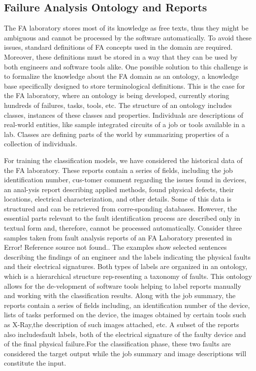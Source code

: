 \subsection{Failure Analysis Ontology and Reports}
\alert{The  FA  laboratory  stores  most  of  its  knowledge  as  free  texts, thus they might be ambiguous and cannot be processed by the software automatically. To avoid these issues, standard definitions of FA concepts used in the domain are required.  Moreover,  these  definitions  must  be stored  in  a  way that  they  can  be  used  by  both  engineers  and software tools alike. One  possible  solution  to  this  challenge  is  to  formalize  the knowledge about the FA domain as an ontology, a knowledge base  specifically  designed  to  store  terminological  definitions. This is the case for the FA laboratory, where an ontology is being  developed,  currently  storing  hundreds  of  failures,  tasks, tools, etc. The structure of an ontology includes classes, instances of these classes  and  properties.  Individuals  are  descriptions  of  real-world entities, like sample integrated circuits of a job or tools available  in  a  lab.  Classes  are  defining  parts  of  the  world  by summarizing  properties  of  a  collection  of  individuals.}

\alert{For training the classification models, we have considered the historical  data  of  the FA  laboratory.  These  reports  contain  a series  of  fields,  including  the  job  identification  number,  cus-tomer comment regarding the issues found in devices, an anal-ysis report describing applied methods, found physical defects, their  locations,  electrical  characterization,  and  other  details. Some of this data is structured and can be retrieved from corre-sponding databases. However, the essential parts relevant to the fault  identification  process  are  described  only  in  textual  form and, therefore, cannot be processed automatically.
Consider three samples taken from fault analysis reports of an FA  Laboratory  presented  in Error!  Reference  source  not found..  The  examples  show  selected  sentences  describing  the findings  of  an  engineer  and  the  labels  indicating  the  physical faults  and  their  electrical  signatures.  Both  types  of  labels  are organized in an ontology, which is a hierarchical structure rep-resenting a taxonomy of faults. This ontology allows for the de-velopment of software tools helping to label reports manually and working with the classification results. Along  with  the  job  summary,  the  reports  contain  a  series  of fields including, an identification number of the device, lists of tasks performed on the device, the images obtained by certain tools such as X-Ray,the  description of such images attached, etc. A subset of the reports also includesfault labels, both of the electrical signature of the faulty device and of the final physical failure.For the classification phase, these two faults are considered the target  output  while  the  job  summary  and  image  descriptions will constitute the input.}

